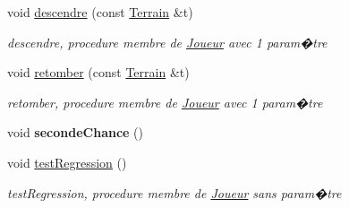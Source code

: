 \begin{DoxyCompactItemize}
void \hyperlink{classJoueur_a70d85a6ad4395a0bceecdf7bbddb9284}{descendre} (const \hyperlink{classTerrain}{Terrain} \&t)
\begin{DoxyCompactList}\small\item\em descendre, procedure membre de \hyperlink{classJoueur}{Joueur} avec 1 param�tre \end{DoxyCompactList}\item 
void \hyperlink{classJoueur_a51fdc4e21c02856d8b2d1c448e4c84e7}{retomber} (const \hyperlink{classTerrain}{Terrain} \&t)
\begin{DoxyCompactList}\small\item\em retomber, procedure membre de \hyperlink{classJoueur}{Joueur} avec 1 param�tre \end{DoxyCompactList}\item 
\mbox{\label{classJoueur_aa3386bd122bd1a9d74ab054e09f5aa55}} 
void {\bfseries seconde\+Chance} ()
\item 
void \hyperlink{classJoueur_a26d38e39feb2ce8534139e7c7ac611cd}{test\+Regression} ()
\begin{DoxyCompactList}\small\item\em test\+Regression, procedure membre de \hyperlink{classJoueur}{Joueur} sans param�tre \end{DoxyCompactList}\end{DoxyCompactItemize}
